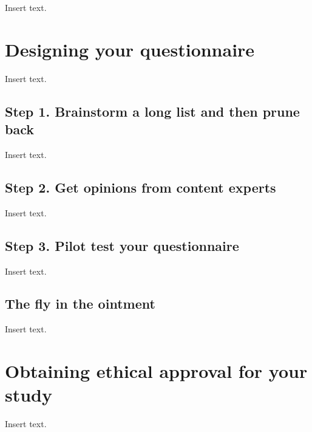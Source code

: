 \documentclass[
  letterpaper,
  DIV=11,
  numbers=noendperiod]{scrreprt}
\begin{document}
Insert text.


\hypertarget{designing-your-questionnaire}{%
\chapter{Designing your
questionnaire}\label{designing-your-questionnaire}}

Insert text.

\hypertarget{step-1.-brainstorm-a-long-list-and-then-prune-back}{%
\section{Step 1. Brainstorm a long list and then prune
back}\label{step-1.-brainstorm-a-long-list-and-then-prune-back}}

Insert text.

\hypertarget{step-2.-get-opinions-from-content-experts}{%
\section{Step 2. Get opinions from content
experts}\label{step-2.-get-opinions-from-content-experts}}

Insert text.

\hypertarget{step-3.-pilot-test-your-questionnaire}{%
\section{Step 3. Pilot test your
questionnaire}\label{step-3.-pilot-test-your-questionnaire}}

Insert text.

\hypertarget{the-fly-in-the-ointment-4}{%
\section{The fly in the ointment}\label{the-fly-in-the-ointment-4}}

Insert text.


\hypertarget{obtaining-ethical-approval-for-your-study}{%
\chapter{Obtaining ethical approval for your
study}\label{obtaining-ethical-approval-for-your-study}}

Insert text.
\end{document}
